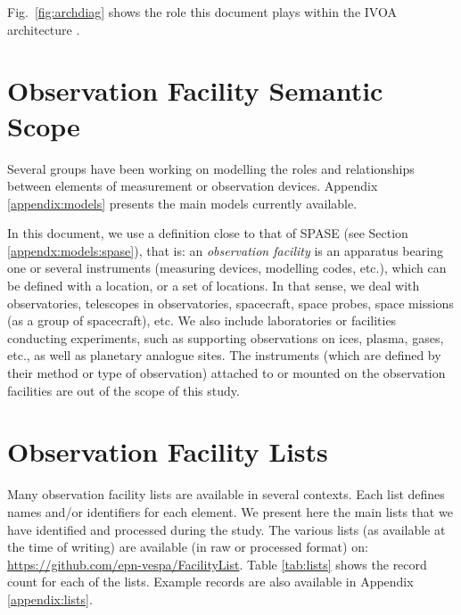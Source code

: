 \documentclass[11pt,a4paper]{ivoa}
\begin{document}
Fig.~\ref{fig:archdiag} shows the role this document plays within the
IVOA architecture \citep{2010ivoa.rept.1123A}.

\section{Observation Facility Semantic Scope}
\label{sec:scope}

Several groups have been working on modelling the roles and
relationships between elements of measurement or observation devices.
Appendix \ref{appendix:models} presents the main models currently
available.

In this document, we use a definition close to that of SPASE
(see Section \ref{appendx:models:spase}), that is: an
\emph{observation facility} is an apparatus bearing one or several
instruments (measuring devices, modelling codes, etc.), which
can be defined with a location, or a set of locations. In that sense, we deal with observatories,
telescopes in observatories, spacecraft, space probes, space missions
(as a group of spacecraft), etc. We also include laboratories or
facilities conducting  experiments, such as supporting observations on
ices, plasma, gases, etc., as well as planetary analogue sites. The
instruments (which are defined by their method or type of observation)
attached to or mounted on the observation facilities are out of the scope
of this study.


\section{Observation Facility Lists}
Many observation facility lists are available in several contexts. Each list
defines names and/or identifiers for each element. We present here the main
lists that we have identified and processed during the study. The various
lists (as available at the time of writing) are available (in raw or
processed format) on: \url{https://github.com/epn-vespa/FacilityList}.
Table \ref{tab:lists} shows the record count for each of the lists.
Example records are also available in Appendix \ref{appendix:lists}.
\end{document}
